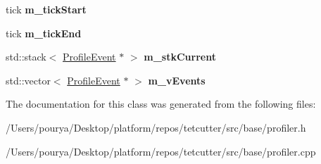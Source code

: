 \begin{DoxyCompactItemize}
\item 
\hypertarget{classps_1_1utils_1_1ProfileSession_abcaea2dea1ac10c7e53eccb5c98ea291}{}tick {\bfseries m\+\_\+tick\+Start}\label{classps_1_1utils_1_1ProfileSession_abcaea2dea1ac10c7e53eccb5c98ea291}

\item 
\hypertarget{classps_1_1utils_1_1ProfileSession_aa3ec76ab65d2821ae82e9aa6d083c3cf}{}tick {\bfseries m\+\_\+tick\+End}\label{classps_1_1utils_1_1ProfileSession_aa3ec76ab65d2821ae82e9aa6d083c3cf}

\item 
\hypertarget{classps_1_1utils_1_1ProfileSession_ae46b13f07a977f916d1a0a5a21333ea9}{}std\+::stack$<$ \hyperlink{classps_1_1utils_1_1ProfileEvent}{Profile\+Event} $\ast$ $>$ {\bfseries m\+\_\+stk\+Current}\label{classps_1_1utils_1_1ProfileSession_ae46b13f07a977f916d1a0a5a21333ea9}

\item 
\hypertarget{classps_1_1utils_1_1ProfileSession_afd3e352b33d4621409d1f3339cba842d}{}std\+::vector$<$ \hyperlink{classps_1_1utils_1_1ProfileEvent}{Profile\+Event} $\ast$ $>$ {\bfseries m\+\_\+v\+Events}\label{classps_1_1utils_1_1ProfileSession_afd3e352b33d4621409d1f3339cba842d}

\end{DoxyCompactItemize}


The documentation for this class was generated from the following files\+:\begin{DoxyCompactItemize}
\item 
/\+Users/pourya/\+Desktop/platform/repos/tetcutter/src/base/profiler.\+h\item 
/\+Users/pourya/\+Desktop/platform/repos/tetcutter/src/base/profiler.\+cpp\end{DoxyCompactItemize}
